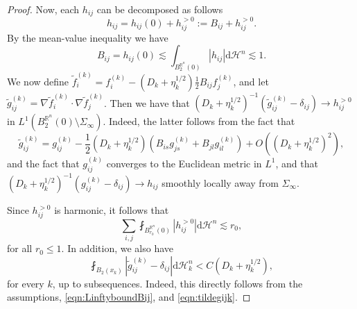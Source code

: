 \documentclass[12pt,a4paper,reqno]{amsart}
\renewcommand{\leq}{\leqslant}
\renewcommand{\d}{\ensuremath{\mathrm d}}
\renewcommand{\tilde}{\widetilde}
\begin{document}
\begin{proof}
    Now, each $h_{ij}$ can be decomposed as follows 
    \[ 
    h_{ij} = h_{ij}(0) + h_{ij}^{>0}:=B_{ij}+ h_{ij}^{>0}. 
    \]
    By the mean-value inequality we have 
    \begin{equation}\label{eqn:LinftyboundBij}
    B_{ij}=h_{ij}(0)\lesssim \int_{B_2^{\mathbb R^n}(0)}|h_{ij}|\d\mathcal{H}^n\lesssim 1.
    \end{equation}
    We now define $\tilde{f}^{(k)}_i = f^{(k)}_i - (D_k+\eta_k^{1/2}) \frac{1}{2}B_{ij} f^{(k)}_j$, and let $\tilde{g}_{ij}^{(k)} = \nabla \tilde{f}^{(k)}_i\cdot \nabla \tilde{f}^{(k)}_j$. Then we have that $(D_k+\eta_k^{1/2})^{-1}(\tilde{g}_{ij}^{(k)} - \delta_{ij}) \to h_{ij}^{>0}$ in $L^1(B_2^{\mathbb R^n}(0)\setminus\Sigma_\infty)$. {Indeed, the latter follows from the fact that
    \begin{equation}\label{eqn:tildegijk}
    \tilde g_{ij}^{(k)} = g_{ij}^{(k)}-\frac{1}{2}(D_k+\eta_k^{1/2})\left(B_{is}g_{js}^{(k)}+B_{jl}g_{il}^{(k)}\right)+O((D_k+\eta_k^{1/2})^2),
    \end{equation}
    and the fact that $g_{ij}^{(k)}$ converges to the Euclidean metric in  $L^1$, and that $(D_k+\eta_k^{1/2})^{-1}(g_{ij}^{(k)}-\delta_{ij})\to h_{ij}$ smoothly locally away from $\Sigma_\infty$.
    }
    \smallskip
    
    Since $h_{ij}^{>0}$ is harmonic, it follows that
    \begin{equation}\label{eqn:DecayL2NormHarmonic}
    \sum_{i,j} \fint_{B_{r_0}^{\mathbb R^n}(0)} |h_{ij}^{>0}|\d\mathcal{H}^n \lesssim r_0,
    \end{equation}
    for all $r_0 \leq 1$. {In addition, we also have
    \begin{equation}\label{eqn:CDktildeg}
    \fint_{B_2(x_k)} |\tilde{g}_{ij}^{(k)} - \delta_{ij}|\d\mathcal{H}^n_k < C(D_k+\eta_k^{1/2}), 
    \end{equation}
    for every $k$, up to subsequences. Indeed, this directly follows from the assumptions, \eqref{eqn:LinftyboundBij}, and \eqref{eqn:tildegijk}.}
    \smallskip


\end{proof}
\end{document}
